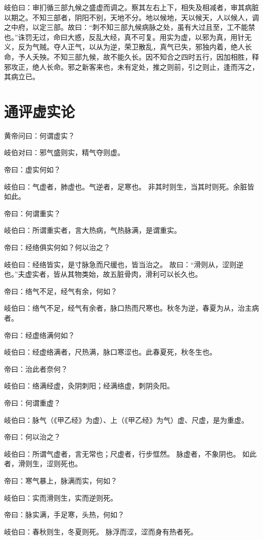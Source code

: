 \documentclass{article}%
\begin{document}
岐伯曰：审扪循三部九候之盛虚而调之。察其左右上下，相失及相减者，审其病脏以期之。不知三部者，阴阳不别，天地不分。地以候地，天以候天，人以候人，调之中府，以定三部。故曰：“刺不知三部九候病脉之处，虽有大过且至，工不能禁也。”诛罚无过，命曰大惑，反乱大经，真不可复。用实为虚，以邪为真，用针无义，反为气贼。夺人正气，以从为逆，荣卫散乱，真气已失，邪独内着，绝人长命，予人夭殃。不知三部九候，故不能久长。因不知合之四时五行，因加相胜，释邪攻正，绝人长命。邪之新客来也，未有定处，推之则前，引之则止，逢而泻之，其病立已。


\section{通评虚实论}
黄帝问曰：何谓虚实？

岐伯对曰：邪气盛则实，精气夺则虚。

帝曰：虚实何如？

岐伯曰：气虚者，肺虚也。气逆者，足寒也。
非其时则生，当其时则死。余脏皆如此。

帝曰：何谓重实？

岐伯曰：所谓重实者，言大热病，气热脉满，是谓重实。

帝曰：经络俱实何如？何以治之？

岐伯曰：经络皆实，是寸脉急而尺缓也，皆当治之。
故曰：“滑则从，涩则逆也。”夫虚实者，皆从其物类始，故五脏骨肉，滑利可以长久也。

帝曰：络气不足，经气有余，何如？

岐伯曰：络气不足，经气有余者，脉口热而尺寒也。秋冬为逆，春夏为从，治主病者。

帝曰：经虚络满何如？

岐伯曰：经虚络满者，尺热满，脉口寒涩也。此春夏死，秋冬生也。

帝曰：治此者奈何？

岐伯曰：络满经虚，灸阴刺阳；经满络虚，刺阴灸阳。

帝曰：何谓重虚？

岐伯曰：脉气（《甲乙经》为虚）、上（《甲乙经》为气）虚、尺虚，是为重虚。

帝曰：何以治之？

岐伯曰：所谓气虚者，言无常也；尺虚者，行步恇然。
脉虚者，不象阴也。
如此者，滑则生，涩则死也。

帝曰：寒气暴上，脉满而实，何如？

岐伯曰：实而滑则生，实而逆则死。

帝曰：脉实满，手足寒，头热，何如？

岐伯曰：春秋则生，冬夏则死。
脉浮而涩，涩而身有热者死。
\end{document}
